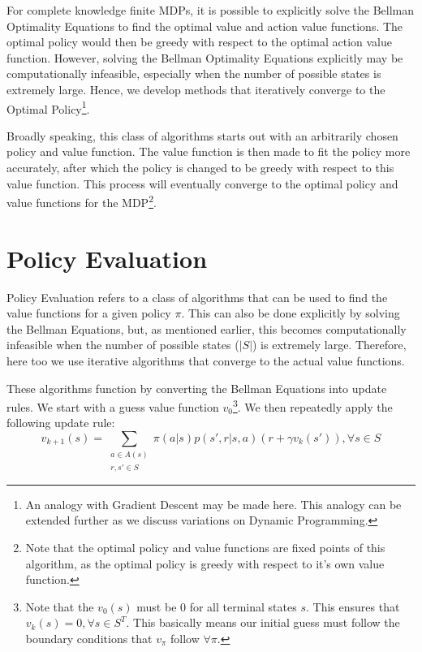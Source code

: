 \documentclass[12pt]{report}
\begin{document}
For complete knowledge finite MDPs, it is possible to explicitly solve the Bellman Optimality Equations to find the optimal value and action value functions. The optimal policy would then be greedy with respect to 
the optimal action value function. However, solving the Bellman Optimality Equations explicitly may be computationally infeasible, especially when the number of possible states is extremely large. Hence, we develop 
methods that iteratively converge to the Optimal Policy\footnote{An analogy with Gradient Descent may be made here. This analogy can be extended further as we discuss variations on Dynamic Programming.}.

Broadly speaking, this class of algorithms starts out with an arbitrarily chosen policy and value function. The value function is then made to fit the policy more accurately, after which the policy is changed to be 
greedy with respect to this value function. This process will eventually converge to the optimal policy and value functions for the MDP\footnote{Note that the optimal policy and value functions are fixed points of this algorithm, as the optimal policy is greedy with respect to it's own value function.}.

\section{Policy Evaluation}
Policy Evaluation refers to a class of algorithms that can be used to find the value functions for a given policy $\pi$. This can also be done explicitly by solving the Bellman Equations, but, as mentioned earlier, this becomes 
computationally infeasible when the number of possible states ($\left|S\right|$) is extremely large. Therefore, here too we use iterative algorithms that converge to the actual value functions.

These algorithms function by converting the Bellman Equations into update rules. We start with a guess value function $v_{0}$\footnote{Note that the $v_{0}(s)$ must be $0$ for all terminal states $s$. This ensures that $v_{k}(s) = 0, \forall s \in S^{T}$. This basically means our initial guess must follow the boundary conditions that $v_{\pi}$ follow $\forall \pi$.}. We then repeatedly apply the following update rule:
\begin{equation}
    v_{k + 1}(s) = \sum\limits_{\substack{a \in A(s)\\r, s' \in S}} \pi(a | s) p(s', r | s, a) (r + \gamma v_{k}(s')), \forall s \in S
\end{equation}
\end{document}
